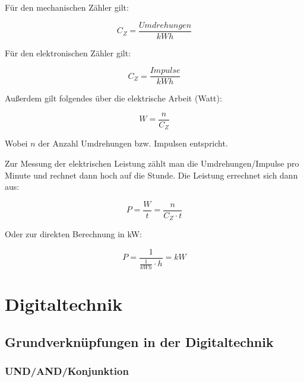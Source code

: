 \documentclass[a4paper, 12pt]{report}
\begin{document}
\begin{multicols}{2}
Für den mechanischen Zähler gilt:

\begin{center}
    \begin{equation}
	C_Z = \frac{Umdrehungen}{kWh}
    \end{equation}
\end{center}

Für den elektronischen Zähler gilt:
\begin{center}
    \begin{equation}
	C_Z = \frac{Impulse}{kWh}
    \end{equation}
\end{center}

Außerdem gilt folgendes über die elektrische Arbeit (Watt):
\begin{center}
    \begin{equation}
	W = \frac{n}{C_Z}
    \end{equation}
\end{center}

Wobei $n$ der Anzahl Umdrehungen bzw. Impulsen entspricht.

Zur Messung der elektrischen Leistung zählt man die Umdrehungen/Impulse pro
Minute und rechnet dann hoch auf die Stunde. Die Leistung errechnet sich dann
aus:

\begin{center}
    \begin{equation}
	P = \frac{W}{t} = \frac{n}{C_Z \cdot t}
    \end{equation}
\end{center}

Oder zur direkten Berechnung in kW:

\begin{center}
    \begin{equation}
	P = \frac{1}{\frac{1}{kWh} \cdot h} = kW
    \end{equation}
\end{center}

\section{Digitaltechnik}

\subsection{Grundverknüpfungen in der Digitaltechnik}

\subsubsection{UND/AND/Konjunktion}


\end{multicols}
\end{document}
